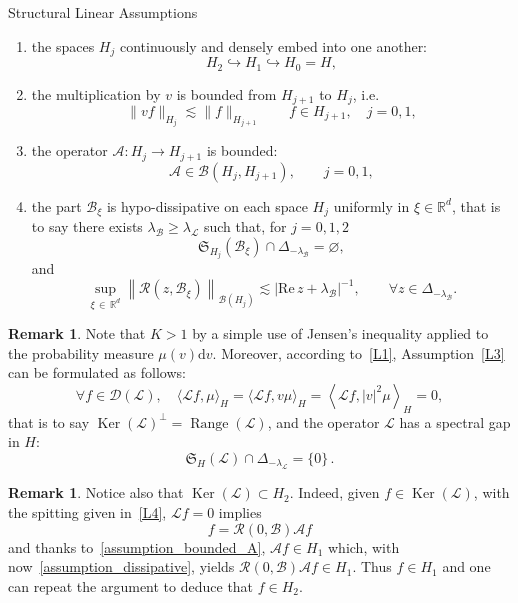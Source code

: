 \documentclass[10pt]{amsart}
\theoremstyle{definition}\newtheorem{defi}[theo]{Definition}\newtheorem{rema}[theo]{Remark}\newtheorem{exam}[theo]{Example}\newtheorem{exem}[theo]{Example}\newtheorem{nota}[theo]{Notation}
\DeclareMathOperator{\range}{Range}
\DeclareMathOperator{\nul}{Ker}
\renewcommand{\d}{\mathrm{d}}
\newcommand{\re}{\mathrm{Re}\,}
\newcommand{\R}{\mathbb{R}}
\newcommand{\fkS}{\mathfrak{S}}
\renewcommand{\AA}{\mathcal{A}}
\newcommand{\BB}{\mathcal{B}}
\newcommand{\LL}{\mathcal{L}}
\newcommand{\RR}{\mathcal{R}}
\newcommand{\dom}{\mathscr{D}}
\newcommand{\BBB}{\mathscr{B}}
\newcommand{\Ss}{H}
\renewcommand*\geq{\geqslant}
\let\oldforall\forall
\renewcommand*{\forall}{\mathrel{\oldforall}}
\begin{document}
\begin{enonce}{Structural Linear Assumptions}
\begin{enumerate}
\begin{enumerate}
\item \label{assumption_hierarchy}
the spaces $\Ss_j$ continuously and densely embed into one another:
\[
\Ss_{2} \hookrightarrow \Ss_1 \hookrightarrow \Ss_0 = \Ss,
\]
\item \label{assumption_multi-v}
the multiplication by $v$ is bounded from $\Ss_{j+1}$ to $\Ss_{j}$, i.e.
\begin{equation*}
\|v f\|_{\Ss_{j}} \lesssim \|f\|_{\Ss_{j+1}} \qquad f \in \Ss_{j+1}, \quad j=0,1,
\end{equation*}
\item \label{assumption_bounded_A}
the operator $\AA : \Ss_j \rightarrow \Ss_{j+1}$ is bounded:
\[
\AA \in \BBB\left(\Ss_j,\Ss_{j+1}\right), \qquad j=0,1,
\]
\item \label{assumption_dissipative}
the part $\BB_{\xi}$ is hypo-dissipative on each space $\Ss_j$ uniformly in $\xi \in \R^d$, that is to say there exists $\lambda_\BB \geq \lambda_{\LL}$ such that, for $j=0,1,2$
\[
\fkS_{\Ss_{j}}(\BB_{\xi}) \cap \Delta_{-\lambda_\BB} = \varnothing,
\]
and
\[
\sup_{\xi\,\in\,\R^{d}}
\left\| \RR(z,\BB_{\xi})\right\|_{\BBB(\Ss_j)} \lesssim | \re z + \lambda_{\BB}|^{-1}, \qquad \forall z \in \Delta_{-\lambda_{\BB}}.
\]
\end{enumerate}
\end{enumerate}
\end{enonce}
\begin{rema}
Note that $K > 1$ by a simple use of Jensen's inequality applied to the probability measure $\mu(v)\d v$. Moreover, according to~\eqref{L1}, Assumption~\eqref{L3} can be formulated as follows:
\begin{equation*}
\forall f \in \dom(\LL), \quad \langle \LL f, \mu \rangle_{\Ss} = \langle \LL f, v \mu \rangle_{\Ss} = \left\langle \LL f, |v|^2 \mu \right\rangle_{\Ss} = 0,
\end{equation*}
that is to say $\nul(\LL)^{\perp}=\range(\LL)$, and the operator $\LL$ has a spectral gap in $\Ss$:
\begin{equation*}
\fkS_{\Ss}(\LL) \cap \Delta_{-\lambda_\LL} = \{0\}\,.
\end{equation*}
\end{rema}
\begin{rema}\label{rem:KernelH2}
Notice also that $\nul(\LL) \subset \Ss_2$. Indeed, given $f \in \nul(\LL)$, with the spitting given in~\eqref{L4}, $\LL f=0$ implies
\[
f=\RR(0,\BB)\AA f
\]
and thanks to~\eqref{assumption_bounded_A}, $\AA f \in \Ss_1$ which, with now~\eqref{assumption_dissipative}, yields $\RR(0,\BB)\AA f\in \Ss_1.$ Thus $f \in \Ss_1$ and one can repeat the argument to deduce that $f \in \Ss_2$.
\end{rema}
\end{document}
